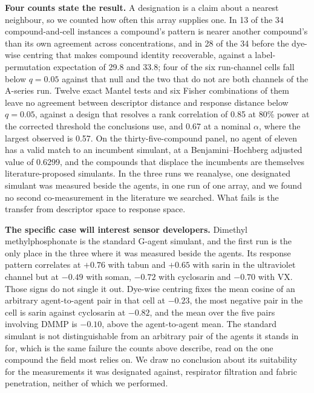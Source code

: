 \documentclass[11pt,letterpaper]{article}
\begin{document}
\textbf{Four counts state the result.} A designation is a claim about a
nearest neighbour, so we counted how often this array supplies one. In 13 of
the 34 compound-and-cell instances a compound's pattern is nearer another
compound's than its own agreement across concentrations, and in 28 of the 34
before the dye-wise centring that makes compound identity recoverable, against
a label-permutation expectation of 29.8 and 33.8; four of the six run-channel
cells fall below $q = 0.05$ against that null and the two that do not are both
channels of the A-series run. Twelve
exact Mantel tests and six Fisher combinations of them leave no agreement
between descriptor distance and response distance below $q = 0.05$, against a
design that resolves a rank correlation of 0.85 at 80\% power at the corrected
threshold the conclusions use, and 0.67 at a nominal $\alpha$, where the
largest observed is 0.57. On the thirty-five-compound panel, no agent of eleven has a
valid match to an incumbent simulant, at a Benjamini--Hochberg adjusted value of
0.6299, and the compounds that displace the incumbents are themselves
literature-proposed simulants. In the three runs we reanalyse, one designated
simulant was measured beside the agents, in one run of one array, and we found
no second co-measurement in the literature we searched. What fails is the
transfer from descriptor space to response space.

\textbf{The specific case will interest sensor developers.} Dimethyl
methylphosphonate is the standard G-agent simulant, and the first run is the
only place in the three where it was measured beside the agents. Its response
pattern correlates at $+0.76$ with tabun and $+0.65$ with sarin in the
ultraviolet channel but at $-0.49$ with soman, $-0.72$ with cyclosarin and
$-0.70$ with VX. Those signs do not single it out. Dye-wise centring fixes the
mean cosine of an arbitrary agent-to-agent pair in that cell at $-0.23$, the
most negative pair in the cell is sarin against cyclosarin at $-0.82$, and the
mean over the five pairs involving DMMP is $-0.10$, above the agent-to-agent
mean. The standard simulant is not distinguishable from an arbitrary pair of
the agents it stands in for, which is the same failure the counts above
describe, read on the one compound the field most relies on. We draw no
conclusion about its suitability for the measurements it was designated
against, respirator filtration and fabric penetration, neither of which we
performed.
\end{document}
